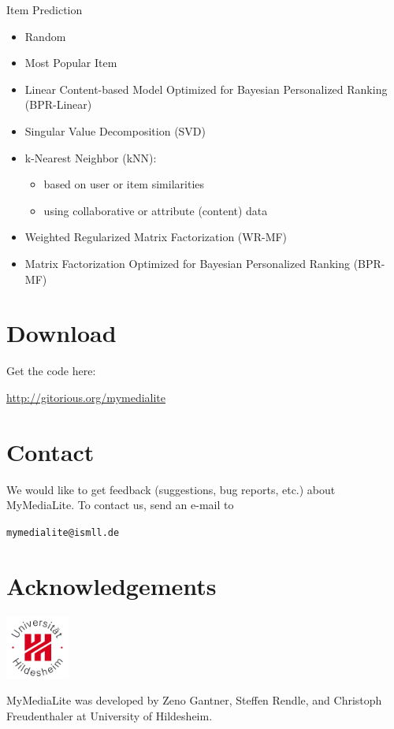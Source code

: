 \documentclass[a4paper, foldmark, 12pt]{leaflet}
\begin{document}
Item Prediction
\begin{itemize}
	\item Random
	\item Most Popular Item
	\item Linear Content-based Model Optimized for Bayesian Personalized Ranking (BPR-Linear)
	\item Singular Value Decomposition (SVD)
	\item k-Nearest Neighbor (kNN):
		\begin{itemize}
			\item based on user or item similarities
			\item using collaborative or attribute (content) data
		\end{itemize}
	\item Weighted Regularized Matrix Factorization (WR-MF)
	\item Matrix Factorization Optimized for Bayesian Personalized Ranking (BPR-MF)
\end{itemize}

\newpage

\section{Download}
Get the code here:
\begin{center}
	\url{http://gitorious.org/mymedialite}
\end{center}

\section{Contact}
We would like to get feedback (suggestions, bug reports, etc.) about MyMediaLite.
To contact us, send an e-mail to
\begin{center}
	\texttt{mymedialite@ismll.de}
\end{center}

\section{Acknowledgements}

\begin{floatingfigure}[r]{1.6cm}
	\vspace{-0.5cm}
	\includegraphics[width=2.1cm]{fig/uni-hildesheim-400x400.jpg}
\end{floatingfigure}
MyMediaLite was developed by Zeno Gantner,
Steffen Rendle, and Christoph Freudenthaler
at University of Hildesheim.
	
\end{document}
